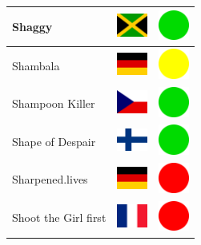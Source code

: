 \documentclass[12pt, a4paper, twoside]{report}
\begin{document}
\begin{center}
\begin{longtable}{|p{5cm}|p{2cm}|p{2cm}|}
 Shaggy                                                     & \includegraphics[width=1cm]{../img/flags/jm} &   \includegraphics[width=1cm]{../likes/y} \\ \hline
 Shambala                                                   & \includegraphics[width=1cm]{../img/flags/de} &   \includegraphics[width=1cm]{../likes/m} \\ \hline
 Shampoon Killer                                            & \includegraphics[width=1cm]{../img/flags/cz} &   \includegraphics[width=1cm]{../likes/y} \\ \hline
 Shape of Despair                                           & \includegraphics[width=1cm]{../img/flags/fi} &   \includegraphics[width=1cm]{../likes/y} \\ \hline
 Sharpened.lives                                            & \includegraphics[width=1cm]{../img/flags/de} &   \includegraphics[width=1cm]{../likes/n} \\ \hline
 Shoot the Girl first                                       & \includegraphics[width=1cm]{../img/flags/fr} &   \includegraphics[width=1cm]{../likes/n} \\ \hline

\end{longtable}
\end{center}
\end{document}
